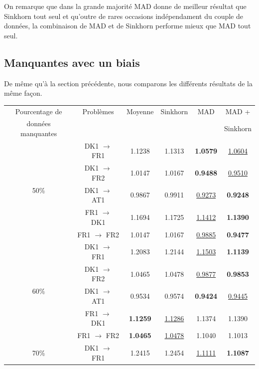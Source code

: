 \documentclass[acmsmall, natbib=false, nonacm]{acmart}
\begin{document}
On remarque que dans la grande majorité MAD donne de meilleur résultat que Sinkhorn tout seul et qu'outre de rares occasions indépendament du couple de données,
la combinaison de MAD et de Sinkhorn performe mieux que MAD tout seul.

\subsection{Manquantes avec un biais}
De même qu'à la section précédente, nous comparons les différents résultats de la même façon.
\begin{table}[H]
    \begin{tabular}{| c | c | c | c | c | c |}
        \hline
        Pourcentage de & Problèmes & Moyenne & Sinkhorn & MAD & MAD + \\
        données manquantes &  &  &  &  & Sinkhorn \\[0.5ex]
        \hline\hline
        \multirow{5}{4em}{50\%} & DK1 $\rightarrow$ FR1 & 1.1238 & 1.1313 & \textbf{1.0579} & \underline{1.0604} \\
                                & DK1 $\rightarrow$ FR2 & 1.0147 & 1.0167 & \textbf{0.9488} & \underline{0.9510} \\
                                & DK1 $\rightarrow$ AT1 & 0.9867 & 0.9911 & \underline{0.9273} & \textbf{0.9248} \\
                                & FR1 $\rightarrow$ DK1 & 1.1694 & 1.1725 & \underline{1.1412} & \textbf{1.1390} \\
                                & FR1 $\rightarrow$ FR2 & 1.0147 & 1.0167 & \underline{0.9885} & \textbf{0.9477} \\
        \hline  
        \multirow{5}{4em}{60\%} & DK1 $\rightarrow$ FR1 & 1.2083 & 1.2144 & \underline{1.1503} & \textbf{1.1139} \\
                                & DK1 $\rightarrow$ FR2 & 1.0465 & 1.0478 & \underline{0.9877} & \textbf{0.9853} \\
                                & DK1 $\rightarrow$ AT1 & 0.9534 & 0.9574 & \textbf{0.9424} & \underline{0.9445} \\
                                & FR1 $\rightarrow$ DK1 & \textbf{1.1259} & \underline{1.1286} & 1.1374 & 1.1390 \\
                                & FR1 $\rightarrow$ FR2 & \textbf{1.0465} & \underline{1.0478} & 1.1040 & 1.1013 \\
        \hline 
        \multirow{5}{4em}{70\%} & DK1 $\rightarrow$ FR1 & 1.2415 & 1.2454 & \underline{1.1111} & \textbf{1.1087} \\

\end{tabular}
\end{table}
\end{document}
